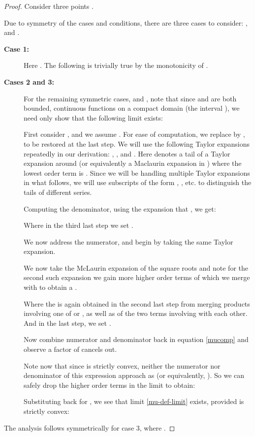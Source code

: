 \documentclass[11pt]{myclass}
\begin{document}
\begin{proof}
Consider three points . 

Due to symmetry of the cases and conditions, there are three cases to consider: ,  and .
\begin{description}
\item[\textbf{Case 1:}]
Here . The following is trivially true by the monotonicity of .



\item[\textbf{Cases 2 and 3:}]
For the remaining symmetric cases,  and , note that since  and  are both bounded, continuous functions on a compact domain (the interval ), we need only show that the following limit exists:


First consider , and we assume . For ease of computation, we replace  by , to be restored 
at the last step. We will use the following Taylor expansions repeatedly in our derivation: , ,  and .  Here  denotes a tail of a Taylor expansion
around  (or equivalently a Maclaurin expansion in ) where the lowest order term is . Since we will be handling
multiple Taylor expansions in what follows, we will use subscripts of the form , , etc. to distinguish the tails
of different series.  


Computing the denominator, using the expansion that , we get:

Where in the third last step we set .

We now address the numerator, and begin by taking the same Taylor expansion.


We now take the McLaurin expansion of the square roots and note for the second such expansion we gain more higher order terms of  which we merge with
 to obtain a . 


Where the  is again obtained in the second last step from merging products involving one of  or  , as well as of the two terms involving  with each other. And in the last step, we set .

Now combine numerator and denominator back in equation \ref{mucomp} and observe a factor of  cancels out. 


Note now that since  is strictly convex, neither the numerator nor denominator of this expression approach  as 
 (or equivalently, ). So we can safely drop the higher order terms in the limit to obtain:


Substituting back  for , we see that limit \ref{mu-def-limit} exists, provided  is strictly convex:



\end{description}
The analysis follows symmetrically for case 3, where .\qedhere
\end{proof}
\end{document}
